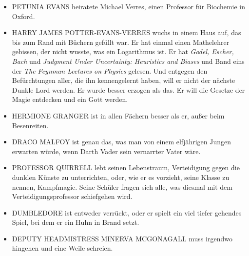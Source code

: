 \begin{itemize}
\item PETUNIA EVANS heiratete Michael Verres, einen Professor für Biochemie in Oxford.
\item HARRY JAMES POTTER-EVANS-VERRES wuchs in einem Haus auf, das bis zum Rand mit Büchern gefüllt war. Er hat einmal einen Mathelehrer gebissen, der nicht wusste, was ein Logarithmus ist. Er hat \emph{Godel, Escher, Bach} und \emph{Judgment Under Uncertainty: Heuristics and Biases} und Band eins der \emph{The Feynman Lectures on Physics} gelesen. Und entgegen den Befürchtungen aller, die ihn kennengelernt haben, will er nicht der nächste Dunkle Lord werden. Er wurde besser erzogen als das. Er will die Gesetze der Magie entdecken und ein Gott werden.
\item HERMIONE GRANGER ist in allen Fächern besser als er, außer beim Besenreiten.
\item DRACO MALFOY ist genau das, was man von einem elfjährigen Jungen erwarten würde, wenn Darth Vader sein vernarrter Vater wäre.
\item PROFESSOR QUIRRELL lebt seinen Lebenstraum, Verteidigung gegen die dunklen Künste zu unterrichten, oder, wie er es vorzieht, seine Klasse zu nennen, Kampfmagie. Seine Schüler fragen sich alle, was diesmal mit dem Verteidigungsprofessor schiefgehen wird.
\item DUMBLEDORE ist entweder verrückt, oder er spielt ein viel tiefer gehendes Spiel, bei dem er ein Huhn in Brand setzt.
\item DEPUTY HEADMISTRESS MINERVA MCGONAGALL muss irgendwo hingehen und eine Weile schreien.
\end{itemize}

